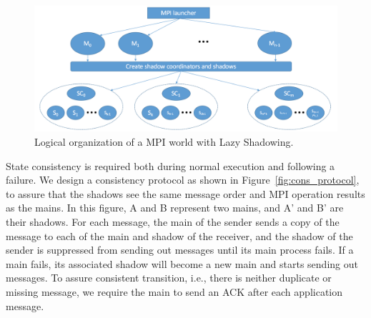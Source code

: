 \begin{figure}[!t]
  \begin{center}
      \includegraphics[width=\columnwidth]{Figures/logical_org}
  \end{center}
  \caption{Logical organization of a MPI world with Lazy Shadowing.}
  \label{fig:logical_org}
\end{figure}

State consistency is required both during normal execution and following a failure. %
We design a consistency protocol as shown in Figure~\ref{fig:cons_protocol}, 
to assure 
that the shadows see the same message order and MPI operation results as the mains. In this figure, A and B represent two mains, and A' and B' are their shadows. 
For each message, the main of the sender sends a copy of the message to each of the main and shadow of the receiver, and the shadow of the sender is suppressed from sending out messages until its main process fails. %
If a main fails,
its associated shadow will become a new main and starts sending out messages.
To assure consistent transition, i.e., there is neither duplicate or missing message, we require the main to send an ACK after each application message. %


